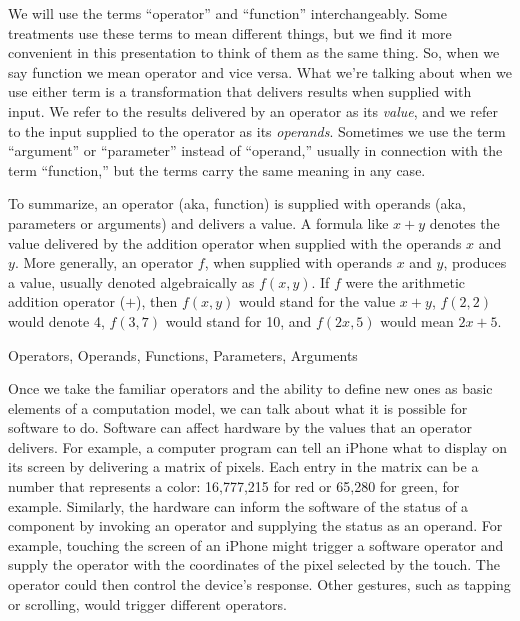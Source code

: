 \begin{aside}
We will use the terms ``operator'' and ``function'' interchangeably.
Some treatments use these terms to mean different things,
but we find it more convenient in this presentation
to think of them as the same thing.
So, when we say function we mean operator and vice versa.
What we're talking about when we use either term
is a transformation that delivers results when supplied with input.
We refer to the results delivered by an operator as its \emph{value},
and we refer to the input supplied
to the operator as its \emph{operands}.
Sometimes we use the term ``argument''
or ``parameter'' instead of ``operand,''
usually in connection with the term ``function,''
but the terms carry the same meaning in any case.

To summarize, an operator (aka, function) is supplied with operands
(aka, parameters or arguments) and delivers a value.
A formula like $x + y$ denotes the value delivered
by the addition operator when supplied with the operands $x$ and $y$.
More generally, an operator $f$, when supplied with operands $x$ and $y$,
produces a value, usually denoted algebraically as $f(x,y)$.
If $f$ were the arithmetic addition operator ($+$),
then $f(x,y)$ would stand for the value $x+y$, $f(2,2)$ would denote 4,
$f(3,7)$ would stand for 10, and $f(2x,5)$ would mean $2x+5$.

\caption{Operators, Operands, Functions, Parameters, Arguments}
\label{operations-and-functions}
\end{aside}

Once we take the familiar operators
and the ability to define new ones
as basic elements of a computation model,
we can talk about what it is possible for software to do.
Software can affect
hardware by the values that an operator delivers.
For example, a computer program can tell an iPhone what to display
on its screen by delivering a matrix of pixels.
Each entry in the matrix
can be a number that represents a color: 16,777,215 for
red or 65,280 for green, for example.
Similarly, the hardware can inform the
software of the status of a component by
invoking an operator and supplying the status as an operand.
For example, touching the screen of an iPhone might
trigger a software operator and supply the operator with
the coordinates of the pixel selected by the touch.
The operator could then control the device's response.
Other gestures, such as tapping or
scrolling, would trigger different operators.

